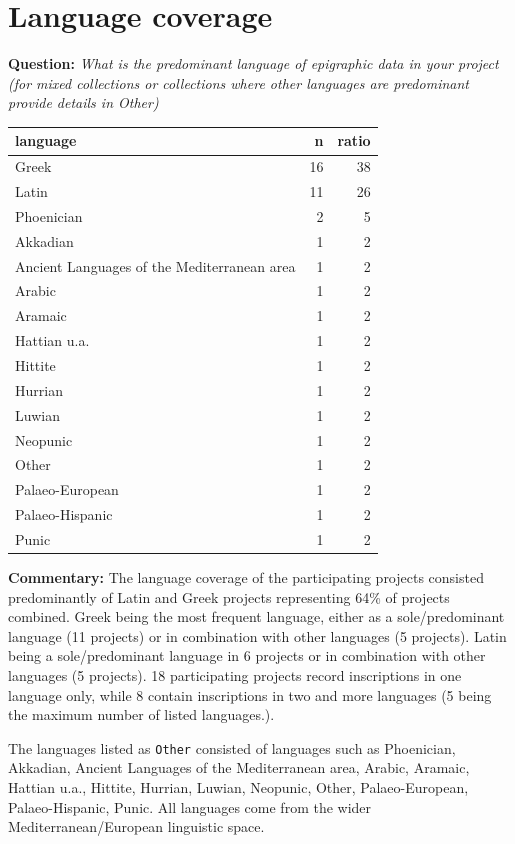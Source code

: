 \documentclass[
  12pt,
]{scrreprt}
\begin{document}
\hypertarget{language-coverage-1}{%
\section{Language coverage}\label{language-coverage-1}}

\textbf{Question:} \emph{What is the predominant language of epigraphic
data in your project (for mixed collections or collections where other
languages are predominant provide details in Other)}

\begin{longtable}[]{@{}lrr@{}}
\toprule
language & n & ratio \\
\midrule
\endhead
Greek & 16 & 38 \\
Latin & 11 & 26 \\
Phoenician & 2 & 5 \\
Akkadian & 1 & 2 \\
Ancient Languages of the Mediterranean area & 1 & 2 \\
Arabic & 1 & 2 \\
Aramaic & 1 & 2 \\
Hattian u.a. & 1 & 2 \\
Hittite & 1 & 2 \\
Hurrian & 1 & 2 \\
Luwian & 1 & 2 \\
Neopunic & 1 & 2 \\
Other & 1 & 2 \\
Palaeo-European & 1 & 2 \\
Palaeo-Hispanic & 1 & 2 \\
Punic & 1 & 2 \\
\bottomrule
\end{longtable}

\textbf{Commentary:} The language coverage of the participating projects
consisted predominantly of Latin and Greek projects representing 64\% of
projects combined. Greek being the most frequent language, either as a
sole/predominant language (11 projects) or in combination with other
languages (5 projects). Latin being a sole/predominant language in 6
projects or in combination with other languages (5 projects). 18
participating projects record inscriptions in one language only, while 8
contain inscriptions in two and more languages (5 being the maximum
number of listed languages.).

The languages listed as \texttt{Other} consisted of languages such as
Phoenician, Akkadian, Ancient Languages of the Mediterranean area,
Arabic, Aramaic, Hattian u.a., Hittite, Hurrian, Luwian, Neopunic,
Other, Palaeo-European, Palaeo-Hispanic, Punic. All languages come from
the wider Mediterranean/European linguistic space.
\end{document}
